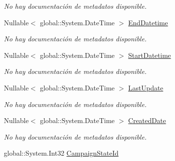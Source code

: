 \begin{DoxyCompactItemize}
\begin{DoxyCompactList}\small\item\em No hay documentación de metadatos disponible. \end{DoxyCompactList}\item 
Nullable$<$ global\-::\-System.\-Date\-Time $>$ \hyperlink{class_microsoft_1_1_samples_1_1_kinect_1_1_basic_interactions_1_1_advert_campaigns_a5915b144e81ee0562da6d8a9fbebe351}{End\-Datetime}
\begin{DoxyCompactList}\small\item\em No hay documentación de metadatos disponible. \end{DoxyCompactList}\item 
Nullable$<$ global\-::\-System.\-Date\-Time $>$ \hyperlink{class_microsoft_1_1_samples_1_1_kinect_1_1_basic_interactions_1_1_advert_campaigns_a31321c7dc66a8e4746aa011bb0bfc383}{Start\-Datetime}
\begin{DoxyCompactList}\small\item\em No hay documentación de metadatos disponible. \end{DoxyCompactList}\item 
Nullable$<$ global\-::\-System.\-Date\-Time $>$ \hyperlink{class_microsoft_1_1_samples_1_1_kinect_1_1_basic_interactions_1_1_advert_campaigns_a2e8334eef78608d8e30033d1444d818f}{Last\-Update}
\begin{DoxyCompactList}\small\item\em No hay documentación de metadatos disponible. \end{DoxyCompactList}\item 
Nullable$<$ global\-::\-System.\-Date\-Time $>$ \hyperlink{class_microsoft_1_1_samples_1_1_kinect_1_1_basic_interactions_1_1_advert_campaigns_a575b129e4c0cb6f0ee984efd04c086c9}{Created\-Date}
\begin{DoxyCompactList}\small\item\em No hay documentación de metadatos disponible. \end{DoxyCompactList}\item 
global\-::\-System.\-Int32 \hyperlink{class_microsoft_1_1_samples_1_1_kinect_1_1_basic_interactions_1_1_advert_campaigns_af60ac85a5c67b37474b4fde75719024d}{Campaign\-State\-Id}

\end{DoxyCompactItemize}
